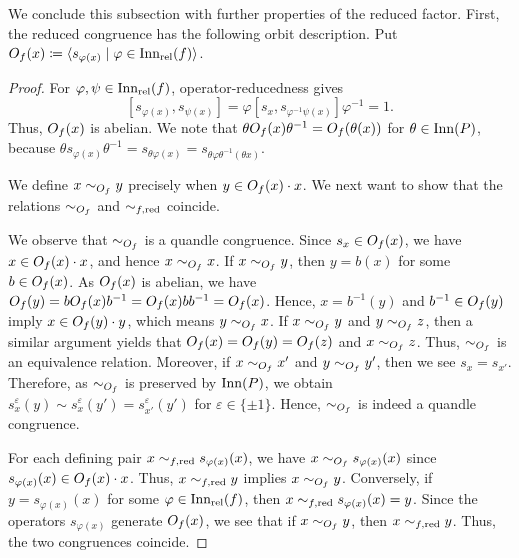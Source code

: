 We conclude this subsection with further properties of the reduced factor. First, the reduced congruence has the following orbit description. Put $O_f(x)\coloneqq \langle s_{\varphi(x)}\mid\varphi\in\operatorname{Inn_{rel}}(f)\rangle$.


\begin{proof}
For $\varphi,\psi\in\operatorname{Inn_{rel}}(f)$, operator-reducedness gives
\[ [s_{\varphi(x)},s_{\psi(x)}] = \varphi[s_x,s_{\varphi^{-1}\psi(x)}]\varphi^{-1} = 1. \]
Thus, $O_f(x)$ is abelian.
We note that $\theta O_f(x) \theta^{-1}= O_f(\theta(x))$ for $\theta\in \operatorname{Inn}(P)$, because $\theta s_{\varphi(x)} \theta^{-1} = s_{\theta\varphi(x)} = s_{\theta\varphi\theta^{-1}(\theta x)}$.

We define $x \sim_{O_f} y$ precisely when $y \in O_f(x)\cdot x$. We next want to show that the relations $\sim_{O_f}$ and $\sim_{f, \mathrm{red}}$ coincide.

We observe that $\sim_{O_f}$ is a quandle congruence. Since $s_x\in O_f(x)$, we have $x\in O_f(x)\cdot x$, and hence $x \sim_{O_f} x$.
If $x\sim_{O_f} y$, then $y=b(x)$ for some $b \in O_f(x)$. As $O_f(x)$ is abelian, we have $O_f(y) = bO_f(x) b^{-1} = O_f(x) bb^{-1}=O_f(x)$. Hence, $x=b^{-1}(y)$ and $b^{-1}\in O_f(y)$ imply $x \in O_f(y)\cdot y$, which means $y \sim_{O_f} x$.
If $x \sim_{O_f} y$ and $y \sim_{O_f} z$, then a similar argument yields that $O_f(x)= O_f(y) = O_f(z)$ and $x\sim_{O_f}z$. Thus, $\sim_{O_f}$ is an equivalence relation.
Moreover, if $x \sim_{O_f} x'$ and $y \sim_{O_f} y'$, then we see $s_x=s_{x'}$. Therefore, as $\sim_{O_f}$ is preserved by $\operatorname{Inn}(P)$, we obtain $s_x^\varepsilon(y)\sim s_x^\varepsilon(y') =s_{x'}^\varepsilon(y')$ for $\varepsilon\in\{\pm 1\}$. Hence, $\sim_{O_f}$ is indeed a quandle congruence.

For each defining pair $x \sim_{f, \mathrm{red}} s_{\varphi(x)}(x)$, we have $x \sim_{O_f} s_{\varphi(x)}(x)$ since $s_{\varphi(x)}(x) \in O_f(x)\cdot x$. Thus, $x\sim_{f, \mathrm{red}}y$ implies $x\sim_{O_f} y$.
Conversely, if $y=s_{\varphi(x)}(x)$ for some $\varphi \in\operatorname{Inn_{rel}}(f)$, then $x\sim_{f, \mathrm{red}} s_{\varphi(x)}(x)=y$. Since the operators $s_{\varphi(x)}$ generate $O_f(x)$, we see that if $x\sim_{O_f} y$, then $x\sim_{f, \mathrm{red}}y$.
Thus, the two congruences coincide.
\end{proof}






